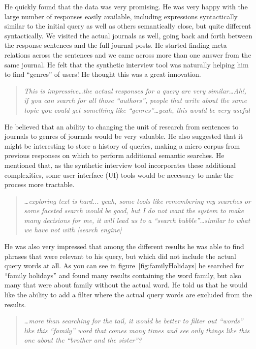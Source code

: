 \documentclass{sigchi}
\begin{document}
He quickly found that the data was very promising. He was very happy with the large number of responses easily available, including expressions syntactically similar to the initial query as well as others semantically close, but quite different syntactically. We visited the actual journals as well, going back and forth between the response sentences and the full journal posts. He started finding meta relations across the sentences and we came across more than one answer from the same journal. He felt that the synthetic interview tool was naturally helping him to find ``genres'' of users! He thought this was a great innovation. 

\begin{quote}
{\em
This is impressive\dots the actual responses for a query are very similar\dots Ah!, if you can search for all those ``authors'', people that write about the same topic you could get something like ``genres''\dots yeah, this would be very useful
}\end{quote}

He believed that an ability to changing the unit of research from sentences to journals to genres of journals would be very valuable. He also suggested that it might be interesting to store a history of queries, making a micro corpus from previous responses on which to perform additional semantic searches. He mentioned that, as the synthetic interview tool incorporates these additional complexities, some user interface (UI) tools would be necessary to make the process more tractable. 

\begin{quote}
{\em
\dots exploring text is hard... yeah, some tools like remembering my searches or some faceted search would be good, but I do not want the system to make many decisions for me, it will lead us to a ``search bubble''\dots similar to what we have not with [search engine]
}\end{quote}

He was also very impressed that among the different results he was able to find phrases that were relevant to his query, but which did not include the actual query words at all. As you can see in figure~\ref{fig:familyHolidays} he searched for ``family holidays'' and found many results containing the word family, but also many that were about family without the actual word. He told us that he would like the ability to add a filter where the actual query words are excluded from the results.

\begin{quote}
{\em
\dots more than searching for the tail, it would be better to filter out ``words'' like this ``family'' word that comes many times and see only things like this one about the ``brother and the sister''?
}\end{quote}
\end{document}
